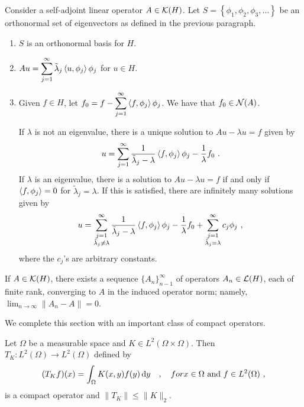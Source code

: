 \begin{theorem} \label{fu_an_HStheorem}
Consider a self-adjoint linear operator $A \in \mathcal{K}(H)$.
Let $\displaystyle S = \left\{ \phi_1, \phi_2, \phi_3, \ldots \right\}$ be
an orthonormal set of eigenvectors as defined in the previous
paragraph.
\begin{enumerate}
\item $S$ is an orthonormal basis for $H$.
\item $\displaystyle Au =
\sum_{j=1}^{\infty} \tilde{\lambda}_j \left\langle{u} , {\phi_j}\right\rangle\phi_j$ for $u \in H$.
\item Given $f\in H$, let
$\displaystyle f_0 = f - \sum_{j=1}^{\infty} \left\langle{f} , {\phi_j}\right\rangle\phi_j$.
We have that $f_0 \in \mathcal{N}(A)$.

If $\lambda$ is not an eigenvalue, there is a unique solution
to $\displaystyle Au - \lambda u = f$ given by
\[
u = \sum_{j=1}^{\infty} \frac{1}{\tilde{\lambda}_j-\lambda}
\left\langle{f} , {\phi_j}\right\rangle \phi_j - \frac{1}{\lambda} f_0 \ .
\]
If $\lambda$ is an eigenvalue, there is a solution to
$\displaystyle Au - \lambda u = f$ if and only if
$\displaystyle \left\langle{f} , {\phi_j}\right\rangle = 0$ for $\tilde{\lambda}_j = \lambda$.
If this is satisfied, there are infinitely many solutions given by
\[
u = \sum_{\substack{j=1\\ \tilde{\lambda}_j\neq \lambda}}^\infty
\frac{1}{\tilde{\lambda}_j-\lambda} \left\langle{f} , {\phi_j}\right\rangle \phi_j -
\frac{1}{\lambda} f_0
+ \sum_{\substack{j=1\\ \tilde{\lambda}_j  = \lambda}}^\infty c_j \phi_j \ ,
\]
where the $c_j$'s are arbitrary constants.
\end{enumerate}
\end{theorem}

\begin{theorem}
If $A \in \mathcal{K}(H)$, there exists a sequence
$\displaystyle \{A_n\}_{n-1}^\infty$ of
operators $A_n \in \mathcal{L}(H)$, each of finite rank, converging to $A$ in
the induced operator norm; namely,
$\displaystyle \lim_{n\rightarrow \infty} \|A_n-A\| = 0$.
\end{theorem}

We complete this section with an important class of compact operators.

\begin{theorem} \label{fu_an_HSKern}
Let $\Omega$ be a measurable space and
$\displaystyle K \in L^2(\Omega\times \Omega)$.  Then
$\displaystyle T_K:L^2(\Omega)\rightarrow L^2(\Omega)$ defined by
\[
(T_K f)(x) = \int_{\Omega} K(x,y) f(y) \,\mathrm{d}{y} \quad , \quad for x \in \Omega
\ \text{and} \ f \in L^2(\Omega) \ ,
\]
is a compact operator and $\|T_K\| \leq \|K\|_2$.
\end{theorem}

